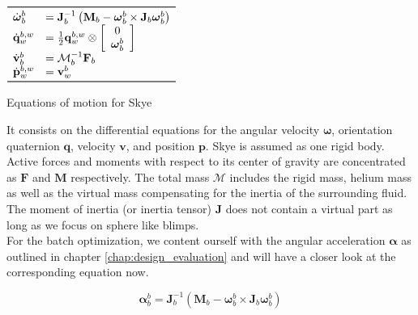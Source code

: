 \begin{table}[htb!]
\centering
\label{tab:sys_mod}
$\begin{array}{ll}
\toprule
\dot{\boldsymbol{\omega}}_b^b &= \mathbf{J}_b^{-1} \left( \mathbf{M}_b  - \boldsymbol{\omega}_b^b \times \mathbf{J}_b \boldsymbol{\omega}_b^b \right) \\

\dot{\mathbf{q}}_w^{b,w} &= \frac{1}{2} \mathbf{q}_w^{b,w} \otimes \left[
\begin{array}{c}
	0 \\ \boldsymbol{\omega}_b^b
\end{array} \right] \\

\dot{\mathbf{v}}_b^b &= \mathbf{\mathcal{M}}_b^{-1} \mathbf{F}_b \\

\dot{\mathbf{p}}_w^{b,w} &= \mathbf{v}_w^b \\

\bottomrule
\end{array}$
\caption{Equations of motion for Skye}
\end{table}

It consists on the differential equations for the angular velocity $\boldsymbol{\omega}$, orientation quaternion $\mathbf{q}$, velocity $\mathbf{v}$, and position $\mathbf{p}$.
Skye is assumed as one rigid body.
Active forces and moments with respect to its center of gravity are concentrated as $\mathbf{F}$ and $\mathbf{M}$ respectively.
The total mass $\mathbf{\mathcal{M}}$ includes the rigid mass, helium mass as well as the virtual mass compensating for the inertia of the surrounding fluid.
The moment of inertia (or inertia tensor) $\mathbf{J}$ does not contain a virtual part as long as we focus on sphere like blimps.
\\
For the batch optimization, we content ourself with the angular acceleration $\boldsymbol{\alpha}$ as outlined in chapter \ref{chap:design_evaluation} and will have a closer look at the corresponding equation now.

\begin{equation}
\label{eq:angular_accel}
\boldsymbol{\alpha}_b^b = \mathbf{J}_b^{-1} \left( \mathbf{M}_b  - \boldsymbol{\omega}_b^b \times \mathbf{J}_b \boldsymbol{\omega}_b^b \right)
\end{equation}

